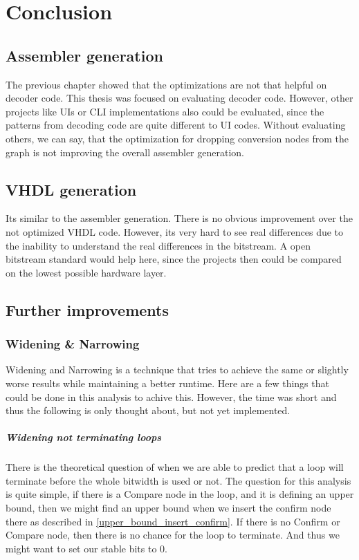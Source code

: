 \chapter{Conclusion}\label{sec:conclusion}

\section{Assembler generation}
The previous chapter showed that the optimizations are not that helpful on decoder code. This thesis was focused on evaluating decoder code. However, other projects like UIs or CLI implementations also could be evaluated, since the patterns from decoding code are quite different to UI codes. Without evaluating others, we can say, that the optimization for dropping conversion nodes from the graph is not improving the overall assembler generation.

\section{VHDL generation}
Its similar to the assembler generation. There is no obvious improvement over the not optimized VHDL code. However, its very hard to see real differences due to the inability to understand the real differences in the bitstream. A open bitstream standard would help here, since the projects then could be compared on the lowest possible hardware layer.
\section{Further improvements}
\subsection{Widening \& Narrowing}

Widening and Narrowing is a technique that tries to achieve the same or slightly worse results while maintaining a better runtime. Here are a few things that could be done in this analysis to achive this. However, the time was short and thus the following is only thought about, but not yet implemented.

\paragraph{Widening not terminating loops}
There is the theoretical question of when we are able to predict that a loop will terminate before the whole bitwidth is used or not. The question for this analysis is quite simple, if there is a Compare node in the loop, and it is defining an upper bound, then we might find an upper bound when we insert the confirm node there as described in \autoref{upper_bound_insert_confirm}. If there is no Confirm or Compare node, then there is no chance for the loop to terminate. And thus we might want to set our stable bits to 0.


